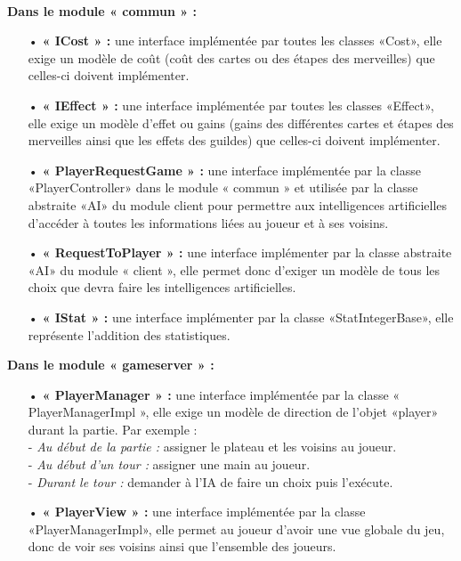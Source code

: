 \documentclass[13pt ,a4paper ]{report}
\begin{document}
\begin{multicols}{2}
 		\paragraph{}
\textbf{Dans le module « commun » :}
 	\begin{itemize}
 	\item[•]\textbf{« ICost » :} une interface implémentée par toutes les classes «Cost», elle exige un modèle de coût (coût des cartes ou des étapes des merveilles) que celles-ci doivent implémenter. 
 	\item[•]\textbf{« IEffect » :} une interface implémentée par toutes les classes «Effect», elle exige un modèle d’effet ou gains (gains des différentes cartes et étapes des merveilles ainsi que les effets des guildes) que celles-ci doivent implémenter.
 	\item[•]\textbf{« PlayerRequestGame » :} une interface implémentée par la classe «PlayerController» dans le module « commun » et utilisée par la classe abstraite «AI» du module client pour permettre aux intelligences artificielles d’accéder à toutes les informations liées au joueur et à ses voisins.
 	\item[•]\textbf{« RequestToPlayer » :} une interface implémenter par la classe abstraite «AI» du module « client », elle permet donc d’exiger un modèle de tous les choix que devra faire les intelligences artificielles.
 	\item[•]\textbf{« IStat » :} une interface implémenter par la classe «StatIntegerBase», elle représente l’addition des statistiques. \\
 	\end{itemize}

\textbf{Dans le module « gameserver » :}
 	\begin{itemize}
 	\item[•]\textbf{« PlayerManager » :} une interface implémentée par la classe « PlayerManagerImpl », elle exige un modèle de direction de l’objet «player» durant la partie. Par exemple :\\
- \textit{Au début de la partie :} assigner le plateau et les voisins au joueur.\\
- \textit{Au début d’un tour :} assigner une main au joueur.\\
- \textit{Durant le tour :} demander à l’IA de faire un choix puis l’exécute.

 	\item[•]\textbf{« PlayerView » : } une interface implémentée par la classe «PlayerManagerImpl», elle permet au joueur d’avoir une vue globale du jeu, donc de voir ses voisins ainsi que l’ensemble des joueurs. \\
\end{itemize}


\end{multicols}
\end{document}
